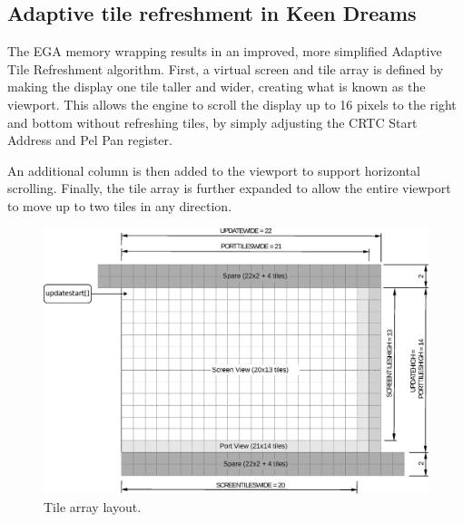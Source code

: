 \documentclass[book.tex]{subfiles}
\begin{document}
 
\par
\begin{minipage}{\textwidth}
  
  \end{minipage}
  \label{ega_latch_copy}


\subsection{Adaptive tile refreshment in Keen Dreams} 
\label{section:scroll_refresh_dreams}
The EGA memory wrapping results in an improved, more simplified Adaptive Tile Refreshment algorithm. First, a virtual screen and tile array is defined by making the display one tile taller and wider, creating what is known as the viewport. This allows the engine to scroll the display up to 16 pixels to the right and bottom without refreshing tiles, by simply adjusting the CRTC Start Address and Pel Pan register.\\

\par
An additional column is then added to the viewport to support horizontal scrolling. Finally, the tile array is further expanded to allow the entire viewport to move up to two tiles in any direction.\\


\begin{figure}[H]
\centering
\includegraphics[width=\textwidth]{imgs/drawings/buffer_tile_layout.eps}
\caption{Tile array layout.}
\label{fig:screen_setup}
\end{figure}
\end{document}
